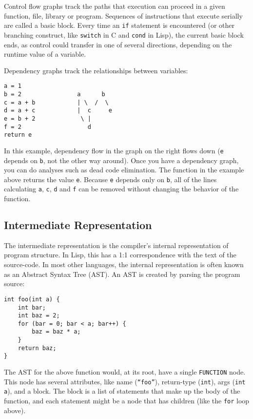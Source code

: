 \documentclass[twoside]{article}
\begin{document}
Control flow graphs track the paths that execution can proceed in a
given function, file, library or program.  Sequences of instructions
that execute serially are called a basic block.  Every time an
\texttt{if} statement is encountered (or other branching construct,
like \texttt{switch} in C and \texttt{cond} in Lisp), the current
basic block ends, as control could transfer in one of several
directions, depending on the runtime value of a variable.

Dependency graphs track the relationships between variables:
\begin{verbatim}
a = 1
b = 2                a      b
c = a + b            | \  /  \
d = a + c            |  c     e
e = b + 2             \ |
f = 2                   d
return e
\end{verbatim}
In this example, dependency flow in the graph on the right flows down
(\texttt{e} depends on \texttt{b}, not the other way around).  Once
you have a dependency graph, you can do analyses such as dead code
elimination.  The function in the example above returns the value
\texttt{e}.  Because \texttt{e} depends only on \texttt{b}, all of the
lines calculating \texttt{a}, \texttt{c}, \texttt{d} and \texttt{f}
can be removed without changing the behavior of the function.

\subsection{Intermediate Representation}

The intermediate representation is the compiler's internal
representation of program structure.  In Lisp, this has a 1:1
correspondence with the text of the source-code.  In most other
languages, the internal representation is often known as an Abstract
Syntax Tree (AST).  An AST is created by parsing the program source:
\begin{verbatim}
int foo(int a) {
    int bar;
    int baz = 2;
    for (bar = 0; bar < a; bar++) {
        baz = baz * a;
    }
    return baz;
}
\end{verbatim}

The AST for the above function would, at its root, have a single
\texttt{FUNCTION} node.  This node has several attributes, like name
(\texttt{``foo''}), return-type (\texttt{int}), args (\texttt{int a}),
and a block.  The block is a list of statements that make up the body
of the function, and each statement might be a node that has children
(like the \texttt{for} loop above).
\end{document}

